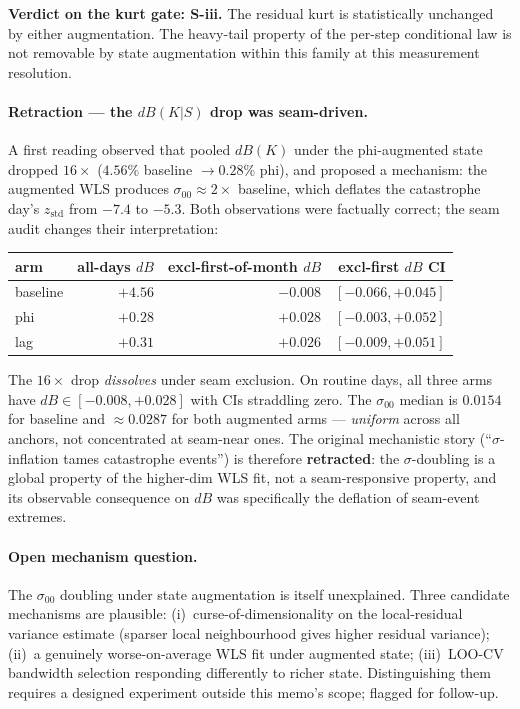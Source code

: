 \documentclass[11pt]{article}
\begin{document}
\textbf{Verdict on the kurt gate: S-iii.} The residual kurt is
statistically unchanged by either augmentation. The heavy-tail
property of the per-step conditional law is not removable by state
augmentation within this family at this measurement resolution.

\paragraph{Retraction --- the \(dB(K | S)\) drop was seam-driven.}
A first reading observed that pooled \(dB(K)\) under the
\textsf{phi}-augmented state dropped \(16\times\) (\(4.56\%\)
baseline \(\to 0.28\%\) phi), and proposed a mechanism: the augmented
WLS produces \(\sigma_{00} \approx 2\times\) baseline, which deflates
the catastrophe day's \(z_{\mathrm{std}}\) from \(-7.4\) to
\(-5.3\). Both observations were factually correct; the seam audit
changes their interpretation:
\begin{center}\small
\begin{tabular}{l r r r}
\toprule
arm & all-days \(dB\) & excl-first-of-month \(dB\) & excl-first \(dB\) CI \\
\midrule
baseline    & \(+4.56\)  & \(-0.008\) & \([-0.066, +0.045]\) \\
\textsf{phi} & \(+0.28\) & \(+0.028\) & \([-0.003, +0.052]\) \\
\textsf{lag} & \(+0.31\) & \(+0.026\) & \([-0.009, +0.051]\) \\
\bottomrule
\end{tabular}
\end{center}
The \(16\times\) drop \emph{dissolves} under seam exclusion. On
routine days, all three arms have \(dB \in [-0.008, +0.028]\) with
CIs straddling zero. The \(\sigma_{00}\) median is \(0.0154\) for
baseline and \(\approx 0.0287\) for both augmented arms ---
\emph{uniform} across all anchors, not concentrated at seam-near
ones. The original mechanistic story
(``\(\sigma\)-inflation tames catastrophe events'') is therefore
\textbf{retracted}: the \(\sigma\)-doubling is a global property of
the higher-dim WLS fit, not a seam-responsive property, and its
observable consequence on \(dB\) was specifically the deflation of
seam-event extremes.

\paragraph{Open mechanism question.} The \(\sigma_{00}\) doubling
under state augmentation is itself unexplained. Three candidate
mechanisms are plausible: (i)~curse-of-dimensionality on the
local-residual variance estimate (sparser local neighbourhood gives
higher residual variance); (ii)~a genuinely worse-on-average WLS fit
under augmented state; (iii)~LOO-CV bandwidth selection responding
differently to richer state. Distinguishing them requires a designed
experiment outside this memo's scope; flagged for follow-up.
\end{document}
